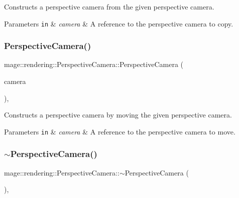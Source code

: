 Constructs a perspective camera from the given perspective camera.


\begin{DoxyParams}[1]{Parameters}
\mbox{\tt in}  & {\em camera} & A reference to the perspective camera to copy. \\
\hline
\end{DoxyParams}
\mbox{\label{classmage_1_1rendering_1_1_perspective_camera_a3d342252cefbffe69537e1ccc95a379a}} 
\subsubsection{\texorpdfstring{Perspective\+Camera()}{PerspectiveCamera()}\hspace{0.1cm}{\footnotesize\ttfamily [3/3]}}
{\footnotesize\ttfamily mage\+::rendering\+::\+Perspective\+Camera\+::\+Perspective\+Camera (\begin{DoxyParamCaption}\item[{\mbox{\hyperlink{classmage_1_1rendering_1_1_perspective_camera}{Perspective\+Camera}} \&\&}]{camera }\end{DoxyParamCaption})\hspace{0.3cm}{\ttfamily [default]}, {\ttfamily [noexcept]}}

Constructs a perspective camera by moving the given perspective camera.


\begin{DoxyParams}[1]{Parameters}
\mbox{\tt in}  & {\em camera} & A reference to the perspective camera to move. \\
\hline
\end{DoxyParams}
\mbox{\label{classmage_1_1rendering_1_1_perspective_camera_ac9bc0faebd323ca26d0311e35612d219}} 
\subsubsection{\texorpdfstring{$\sim$\+Perspective\+Camera()}{~PerspectiveCamera()}}
{\footnotesize\ttfamily mage\+::rendering\+::\+Perspective\+Camera\+::$\sim$\+Perspective\+Camera (\begin{DoxyParamCaption}{ }\end{DoxyParamCaption})\hspace{0.3cm}{\ttfamily [virtual]}, {\ttfamily [default]}}

